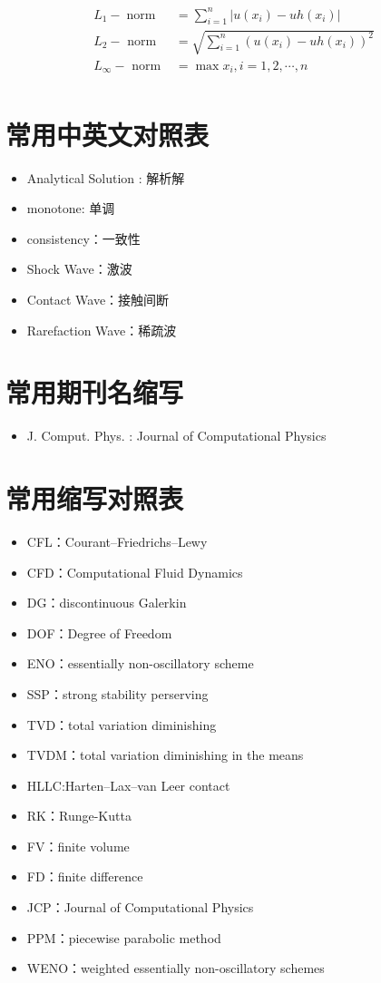\documentclass{book}
\begin{document}
\begin{equation}
  \begin{aligned}
    L_{1}-\operatorname{norm} & =\sum_{i=1}^{n}\left|u\left(x_{i}\right)-u h\left(x_{i}\right)\right|            \\
    L_{2}-\text { norm }      & =\sqrt{\sum_{i=1}^{n}\left(u\left(x_{i}\right)-u h\left(x_{i}\right)\right)^{2}} \\
    L_{\infty}-\text { norm } & =\max x_i,i=1,2,\cdots,n                                                         \\
  \end{aligned}
\end{equation}
\section{常用中英文对照表}
\begin{itemize}
  \item Analytical Solution : 解析解
  \item monotone: 单调
  \item consistency：一致性
  \item Shock Wave：激波
  \item Contact Wave：接触间断
  \item Rarefaction Wave：稀疏波
\end{itemize}
\section{常用期刊名缩写}
\begin{itemize}
  \item J. Comput. Phys. : Journal of Computational Physics
\end{itemize}
\section{常用缩写对照表}
\begin{itemize}
  \item CFL：Courant–Friedrichs–Lewy
  \item CFD：Computational Fluid Dynamics
  \item DG：discontinuous Galerkin
  \item DOF：Degree of Freedom
  \item ENO：essentially non-oscillatory scheme
  \item SSP：strong stability perserving
  \item TVD：total variation diminishing
  \item TVDM：total variation diminishing in the means
  \item HLLC:Harten–Lax–van Leer contact
  \item RK：Runge-Kutta
  \item FV：finite volume
  \item FD：finite difference
  \item JCP：Journal of Computational Physics
  \item PPM：piecewise parabolic method
  \item WENO：weighted essentially non-oscillatory schemes
\end{itemize}


\end{document}

